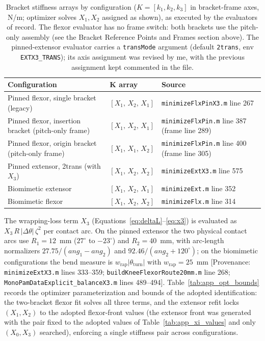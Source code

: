 \begin{table}[htbp]
\caption{Bracket stiffness arrays by configuration ($K = [k_{1}, k_{2}, k_{3}]$ in bracket-frame axes, N/m; optimizer solves $X_{1}, X_{2}$ assigned as shown), as executed by the evaluators of record. The flexor evaluator has no frame switch: both brackets use the pitch-only assembly (see the Bracket Reference Points and Frames section above). The pinned-extensor evaluator carries a \texttt{transMode} argument (default \texttt{2trans}, env \texttt{EXTX3\_TRANS}); its axis assignment was revised by me, with the previous assignment kept commented in the file.}
\label{tab:app_stiffness_arrays}
\begin{tabular}{@{}lll@{}}
\toprule
\textbf{Configuration} & $\boldsymbol{K}$ array & \textbf{Source} \\
\midrule
Pinned flexor, single bracket (legacy)       & $[X_{1},\,X_{2},\,X_{1}]$ & \texttt{minimizeFlxPinX3.m} line 267 \\
Pinned flexor, insertion bracket (pitch-only frame)    & $[X_{1},\,X_{2},\,X_{1}]$ & \texttt{minimizeFlxPin.m} line 387 (frame line 289) \\
Pinned flexor, origin bracket (pitch-only frame) & $[X_{1},\,X_{1},\,X_{2}]$ & \texttt{minimizeFlxPin.m} line 400 (frame line 305) \\
Pinned extensor, 2trans (with $X_{3}$)      & $[X_{1},\,X_{2},\,X_{2}]$ & \texttt{minimizeExtX3.m} line 575 \\
Biomimetic extensor                 & $[X_{1},\,X_{2},\,X_{1}]$ & \texttt{minimizeExt.m} line 352 \\
Biomimetic flexor                   & $[X_{1},\,X_{2},\,X_{2}]$ & \texttt{minimizeFlx.m} line 314 \\
\bottomrule
\end{tabular}
\end{table}

The wrapping-loss term $X_{3}$ (Equations~\ref{eq:deltaL}--\ref{eq:x3}) is evaluated as $X_{3}\,R\,\lvert\Delta\theta\rvert\,\zeta^{2}$ per contact arc. On the pinned extensor the two physical contact arcs use $R_{1} = 12$~mm ($27^{\circ}$ to $-23^{\circ}$) and $R_{2} = 40$~mm, with arc-length normalizers $27.75/(ang_{1} - ang_{2})$ and $92.46/(ang_{2}+120^{\circ})$; on the biomimetic configurations the bend measure is $w_{\text{rap}}\lvert\theta_{\text{turn}}\rvert$ with $w_{\text{rap}} = 25$~mm [Provenance: \texttt{minimizeExtX3.m} lines 333--359; \texttt{buildKneeFlexorRoute20mm.m} line 268; \texttt{MonoPamDataExplicit\_balanceX3.m} lines 489--494]. Table~\ref{tab:app_opt_bounds} records the optimizer parameterization and bounds of the adopted identification: the two-bracket flexor fit solves all three terms, and the extensor refit locks $(X_{1}, X_{2})$ to the adopted flexor-front values (the extensor front was generated with the pair fixed to the adopted values of Table~\ref{tab:app_xi_values} and only $(X_{0}, X_{3})$ searched), enforcing a single stiffness pair across configurations.

